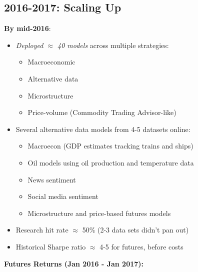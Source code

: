 \documentclass[11pt, letterpaper]{article}
\begin{document}
  \subsection{2016-2017: Scaling Up}
  \label{scaling-up}

  \textbf{By mid-2016}:

  \begin{itemize}
    \item \textit{Deployed $\approx$ 40 models} across multiple strategies:

      \begin{itemize}
        \item Macroeconomic

        \item Alternative data

        \item Microstructure

        \item Price-volume (Commodity Trading Advisor-like)
      \end{itemize}

    \item Several alternative data models from 4-5 datasets online:

      \begin{itemize}
        \item Macroecon (GDP estimates tracking trains and ships)

        \item Oil models using oil production and temperature data

        \item News sentiment

        \item Social media sentiment

        \item Microstructure and price-based futures models
      \end{itemize}

    \item Research hit rate $\approx$ 50\% (2-3 data sets didn't
      pan out)

    \item Historical Sharpe ratio $\approx$ 4-5 for futures, before
      costs
  \end{itemize}

  \textbf{Futures Returns (Jan 2016 - Jan 2017):}
\end{document}
